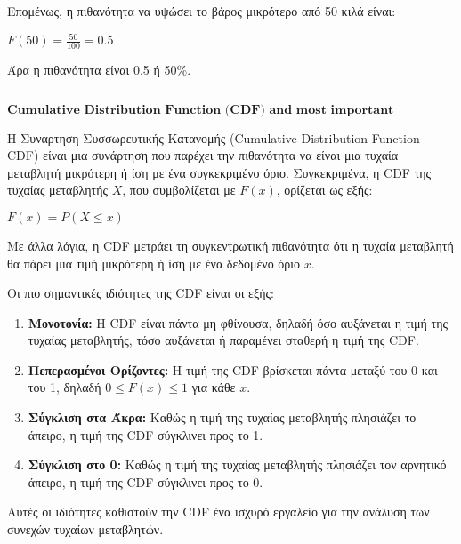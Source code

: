 \documentclass[11pt]{article}
\makeatletter
\newcommand{\boxspacing}{\kern\kvtcb@left@rule\kern\kvtcb@boxsep}
\newcommand{\prompt}[4]{
        {\ttfamily\llap{{\color{#2}[#3]:\hspace{3pt}#4}}\vspace{-\baselineskip}}
    }
\makeatother
\begin{document}
Επομένως, η πιθανότητα να υψώσει το βάρος μικρότερο από 50 κιλά είναι:

$ F(50) = \frac{50}{100} = 0.5 $

Άρα η πιθανότητα είναι 0.5 ή 50\%.

    \begin{tcolorbox}[breakable, size=fbox, boxrule=1pt, pad at break*=1mm,colback=cellbackground, colframe=cellborder]
\prompt{In}{incolor}{ }{\boxspacing}
\begin{Verbatim}[commandchars=\\\{\}]

\end{Verbatim}
\end{tcolorbox}

    \(\textbf{Cumulative Distribution Function (CDF) and most important properties}\)

    Η Συναρτηση Συσσωρευτικής Κατανομής (Cumulative Distribution Function -
CDF) είναι μια συνάρτηση που παρέχει την πιθανότητα να είναι μια τυχαία
μεταβλητή μικρότερη ή ίση με ένα συγκεκριμένο όριο. Συγκεκριμένα, η CDF
της τυχαίας μεταβλητής $ X $, που συμβολίζεται με $ F(x) $, ορίζεται
ως εξής:

$ F(x) = P(X \leq x) $

Με άλλα λόγια, η CDF μετράει τη συγκεντρωτική πιθανότητα ότι η τυχαία
μεταβλητή θα πάρει μια τιμή μικρότερη ή ίση με ένα δεδομένο όριο $ x
$.

Οι πιο σημαντικές ιδιότητες της CDF είναι οι εξής:

\begin{enumerate}
\def\labelenumi{\arabic{enumi}.}
\item
  \textbf{Μονοτονία:} Η CDF είναι πάντα μη φθίνουσα, δηλαδή όσο
  αυξάνεται η τιμή της τυχαίας μεταβλητής, τόσο αυξάνεται ή παραμένει
  σταθερή η τιμή της CDF.
\item
  \textbf{Πεπερασμένοι Ορίζοντες:} Η τιμή της CDF βρίσκεται πάντα μεταξύ
  του 0 και του 1, δηλαδή $ 0 \leq F(x) \leq 1 $ για κάθε $ x $.
\item
  \textbf{Σύγκλιση στα Άκρα:} Καθώς η τιμή της τυχαίας μεταβλητής
  πλησιάζει το άπειρο, η τιμή της CDF σύγκλινει προς το 1.
\item
  \textbf{Σύγκλιση στο 0:} Καθώς η τιμή της τυχαίας μεταβλητής πλησιάζει
  τον αρνητικό άπειρο, η τιμή της CDF σύγκλινει προς το 0.
\end{enumerate}

Αυτές οι ιδιότητες καθιστούν την CDF ένα ισχυρό εργαλείο για την ανάλυση
των συνεχών τυχαίων μεταβλητών.
\end{document}
